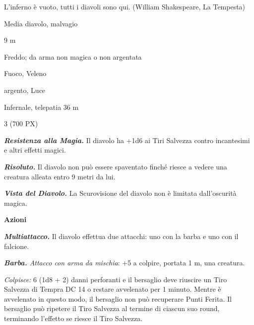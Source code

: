 \begin{multicols}{2}
{\begin{enfasi}{L'inferno è vuoto, tutti i diavoli sono qui. (William Shakespeare, La Tempesta)}\end{enfasi}

\begin{description}[noitemsep, topsep=0pt, parsep=0pt, partopsep=0pt, itemsep=1pt, leftmargin=2.35cm,  labelwidth=2.2cm, itemindent=0cm, listparindent=0pt] %
\setlength{\baselineskip}{10pt}
\item[\textbf{Taglia/Tipo}] Media diavolo, malvagio
\item[\textbf{Caratt.}] 
\item[\textbf{Punti Ferita}] 
\item[\textbf{Movimento}] 9 m
\item[\textbf{Tiri Salvez.}] 
\item[\textbf{Res. Danni}] Freddo; da arma non magica o non argentata
\item[\textbf{Imm. Danni}] Fuoco, Veleno
\item[\textbf{Vulnerabilità}] argento, Luce
\item[\textbf{Sensi}] 
\item[\textbf{Linguaggi}] Infernale, telepatia 36 m
\item[\textbf{Sfida}] 3 (700 PX)
\end{description}
\smallskip

\emph{\textbf{Resistenza alla Magia.}} Il diavolo ha +1d6 ai Tiri Salvezza contro incantesimi e altri effetti magici.

\emph{\textbf{Risoluto.}} Il diavolo non può essere spaventato finché riesce a vedere una creatura alleata entro 9 metri da lui.

\emph{\textbf{Vista del Diavolo.}} La Scurovisione del diavolo non è limitata dall'oscurità magica.

\textbf{Azioni}

\emph{\textbf{Multiattacco.}} Il diavolo effettua due attacchi: uno con la barba e uno con il falcione.

\emph{\textbf{Barba.} Attacco con arma da mischia}: +5 a colpire, portata 1 m, una creatura.

\emph{Colpisce:} 6 (1d8 + 2) danni perforanti e il bersaglio deve riuscire un Tiro Salvezza di Tempra DC 14 o restare avvelenato per 1 minuto. Mentre è avvelenato in questo modo, il bersaglio non può recuperare Punti Ferita. Il bersaglio può ripetere il Tiro Salvezza al termine di ciascun suo round, terminando l'effetto se riesce il Tiro Salvezza.

}
\end{multicols}
